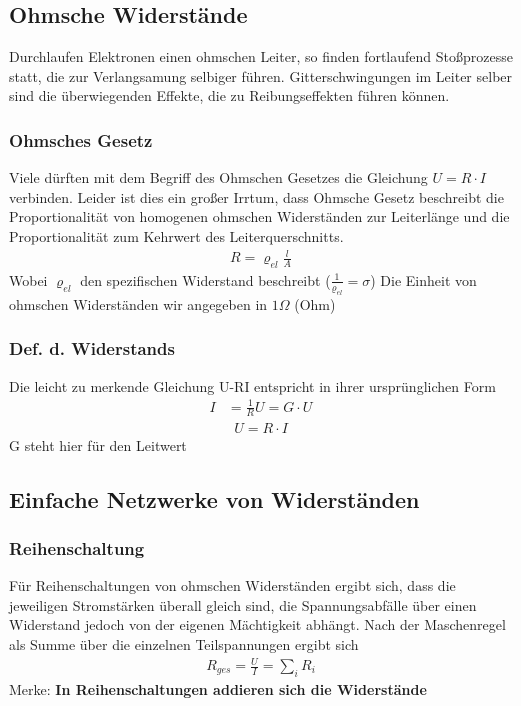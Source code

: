 \subsection{Ohmsche Widerstände}
Durchlaufen Elektronen einen ohmschen Leiter, so finden fortlaufend Stoßprozesse statt, die zur Verlangsamung selbiger führen. Gitterschwingungen im Leiter selber sind die überwiegenden Effekte, die zu Reibungseffekten führen können.

\subsubsection{Ohmsches Gesetz}
Viele dürften mit dem Begriff des Ohmschen Gesetzes die Gleichung $U = R\cdot I$ verbinden. Leider ist dies ein großer Irrtum, dass Ohmsche Gesetz beschreibt die Proportionalität von homogenen ohmschen Widerständen zur Leiterlänge und die Proportionalität zum Kehrwert des Leiterquerschnitts.
\begin{align} \label{eqn:Ohmsches Gesetz}
\boxed{R = \varrho_{el} \frac{l}{A}}
\end{align}Wobei $\varrho_{el}$ den spezifischen Widerstand beschreibt ($\frac{1}{\varrho_{el}} =  \sigma$) Die Einheit von ohmschen Widerständen wir angegeben in $1 \Omega$ (Ohm)

\subsubsection{Def. d. Widerstands}
Die leicht zu merkende Gleichung U-RI entspricht in ihrer ursprünglichen Form\begin{align} \label{eqn:Definition d. Widerstands}
I 			&= \frac{1}{R}U = G\cdot U
\end{align}\begin{align} \label{eqn:URI}
\boxed{U = R \cdot I}
\end{align}
G steht hier für den Leitwert

\subsection{Einfache Netzwerke von Widerständen}
\subsubsection{Reihenschaltung}
Für Reihenschaltungen von ohmschen Widerständen ergibt sich, dass die jeweiligen Stromstärken überall gleich sind, die Spannungsabfälle über einen Widerstand jedoch von der eigenen Mächtigkeit abhängt. Nach der Maschenregel als Summe über die einzelnen Teilspannungen ergibt sich
\begin{align} \label{eqn:Gesamtwiderstand Reihenschaltung}
\boxed{R_{ges} = \frac{U}{I} = \sum\limits_i R_i}
\end{align}Merke: \textbf{In Reihenschaltungen addieren sich die Widerstände}

